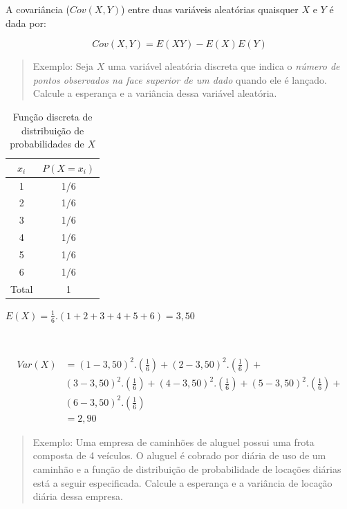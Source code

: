 \documentclass[
]{book}
\begin{document}
\hfill\break

A covariância (\(Cov(X,Y)\)) entre duas variáveis aleatórias quaisquer \(X\) e \(Y\) é dada por:

\hfill\break

\[
Cov \left(X,Y\right)= E(XY) - E(X)E(Y)
\]

\hfill\break

\hfill\break

\begin{quote}
Exemplo: Seja \(X\) uma variável aleatória discreta que indica o \emph{número de pontos observados na face superior de um dado} quando ele é lançado. Calcule a esperança e a variância dessa variável aleatória.
\end{quote}

\hfill\break

\begin{table}[htbp]
\centering
\caption*{Função discreta de distribuição de probabilidades de $X$}
\begin{tabular}{|c|c|}
\hline
$x_{i}$  & $P(X=x_{i})$ \\
\hline
1 & 1/6 \\
\hline
2 & 1/6 \\
\hline
3 & 1/6 \\
\hline
4 & 1/6 \\
\hline
5 & 1/6 \\
\hline
6 & 1/6 \\
\hline
Total & 1  \\
\hline
\end{tabular}
\end{table}

\hfill\break

\(E(X) = \frac{1}{6} . (1+2+3+4+5+6) = 3,50\)

~

\begin{align*}
Var(X) & = (1-3,50)^{2}.(\frac{1}{6}) + (2-3,50)^{2}.(\frac{1}{6}) +\\
       & (3-3,50)^{2}.(\frac{1}{6}) + (4-3,50)^{2}.(\frac{1}{6}) + (5-3,50)^{2}.(\frac{1}{6}) + \\
       & (6-3,50)^{2}.(\frac{1}{6}) \\
       & = 2,90
\end{align*}

\hfill\break

\begin{quote}
Exemplo: Uma empresa de caminhões de aluguel possui uma frota composta de 4 veículos. O aluguel é cobrado por diária de uso de um caminhão e a função de distribuição de probabilidade de locações diárias está a seguir especificada. Calcule a esperança e a variância de locação diária dessa empresa.
\end{quote}
\end{document}
